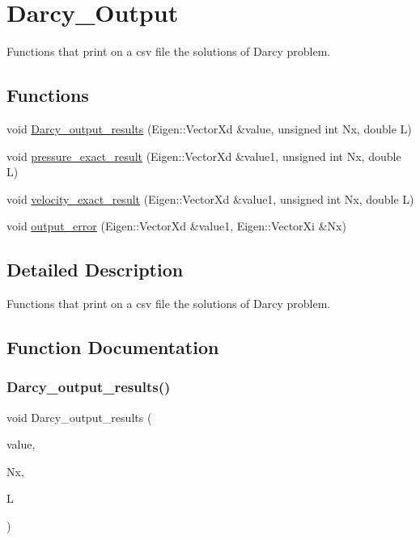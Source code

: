 \hypertarget{group__Darcy__Output}{}\section{Darcy\+\_\+\+Output}
\label{group__Darcy__Output}


Functions that print on a csv file the solutions of Darcy problem.  


\subsection*{Functions}
\begin{DoxyCompactItemize}
\item 
void \hyperlink{group__Darcy__Output_gae32dbfb8ae1dae7d94ce2a07b441be8f}{Darcy\+\_\+output\+\_\+results} (Eigen\+::\+Vector\+Xd \&value, unsigned int Nx, double L)
\item 
void \hyperlink{group__Darcy__Output_ga2bf9f94eb4d11df1e138108c4658977f}{pressure\+\_\+exact\+\_\+result} (Eigen\+::\+Vector\+Xd \&value1, unsigned int Nx, double L)
\item 
void \hyperlink{group__Darcy__Output_gafcb77d3ca0cd554e2141658c6701a001}{velocity\+\_\+exact\+\_\+result} (Eigen\+::\+Vector\+Xd \&value1, unsigned int Nx, double L)
\item 
void \hyperlink{group__Darcy__Output_gaa0d7356820b3cad723d8b5c85b2f77e1}{output\+\_\+error} (Eigen\+::\+Vector\+Xd \&value1, Eigen\+::\+Vector\+Xi \&Nx)
\end{DoxyCompactItemize}


\subsection{Detailed Description}
Functions that print on a csv file the solutions of Darcy problem. 



\subsection{Function Documentation}
\mbox{\label{group__Darcy__Output_gae32dbfb8ae1dae7d94ce2a07b441be8f}} 
\subsubsection{\texorpdfstring{Darcy\+\_\+output\+\_\+results()}{Darcy\_output\_results()}}
{\footnotesize\ttfamily void Darcy\+\_\+output\+\_\+results (\begin{DoxyParamCaption}\item[{Eigen\+::\+Vector\+Xd \&}]{value,  }\item[{unsigned int}]{Nx,  }\item[{double}]{L }\end{DoxyParamCaption})}

